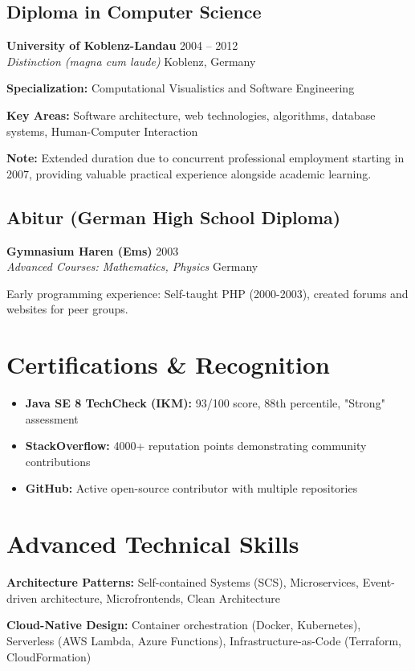 \documentclass[11pt,a4paper]{article}
\newcommand{\role}[4]{\textbf{#1} \hfill #2 \\ \textit{#3} \hfill #4}
\begin{document}
\subsection{Diploma in Computer Science}
\role{University of Koblenz-Landau}{2004 -- 2012}{Distinction (magna cum laude)}{Koblenz, Germany}

\textbf{Specialization:} Computational Visualistics and Software Engineering

\textbf{Key Areas:} Software architecture, web technologies, algorithms, database systems, Human-Computer Interaction

\textbf{Note:} Extended duration due to concurrent professional employment starting in 2007, providing valuable practical experience alongside academic learning.

\subsection{Abitur (German High School Diploma)}
\role{Gymnasium Haren (Ems)}{2003}{Advanced Courses: Mathematics, Physics}{Germany}

Early programming experience: Self-taught PHP (2000-2003), created forums and websites for peer groups.

\section{Certifications \& Recognition}

\begin{itemize}
\item \textbf{Java SE 8 TechCheck (IKM):} 93/100 score, 88th percentile, "Strong" assessment
\item \textbf{StackOverflow:} 4000+ reputation points demonstrating community contributions
\item \textbf{GitHub:} Active open-source contributor with multiple repositories
\end{itemize}

\section{Advanced Technical Skills}

\textbf{Architecture Patterns:} Self-contained Systems (SCS), Microservices, Event-driven architecture, Microfrontends, Clean Architecture

\textbf{Cloud-Native Design:} Container orchestration (Docker, Kubernetes), Serverless (AWS Lambda, Azure Functions), Infrastructure-as-Code (Terraform, CloudFormation)
\end{document}
